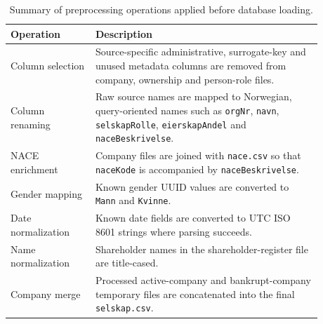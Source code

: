 \begin{table}[htbp]
\centering
\small
\caption{Summary of preprocessing operations applied before database loading.}
\label{tab:appendix-preprocessing-summary}
\begin{tabular}{P{0.24\linewidth}P{0.64\linewidth}}
\toprule
Operation & Description \\
\midrule
Column selection & Source-specific administrative, surrogate-key and unused metadata columns are removed from company, ownership and person-role files. \\
Column renaming & Raw source names are mapped to Norwegian, query-oriented names such as \texttt{orgNr}, \texttt{navn}, \texttt{selskapRolle}, \texttt{eierskapAndel} and \texttt{naceBeskrivelse}. \\
NACE enrichment & Company files are joined with \texttt{nace.csv} so that \texttt{naceKode} is accompanied by \texttt{naceBeskrivelse}. \\
Gender mapping & Known gender UUID values are converted to \texttt{Mann} and \texttt{Kvinne}. \\
Date normalization & Known date fields are converted to UTC ISO 8601 strings where parsing succeeds. \\
Name normalization & Shareholder names in the shareholder-register file are title-cased. \\
Company merge & Processed active-company and bankrupt-company temporary files are concatenated into the final \texttt{selskap.csv}. \\
\bottomrule
\end{tabular}
\end{table}

